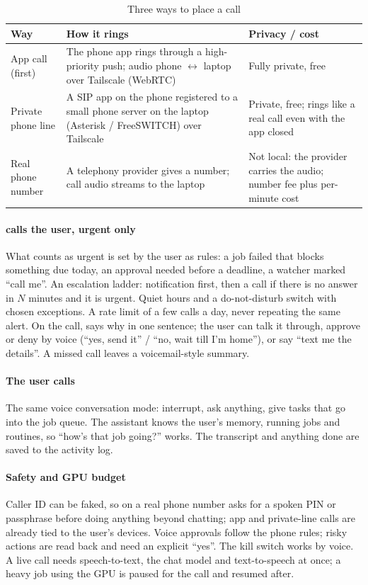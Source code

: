 \begin{table}[t]
\caption{Three ways to place a call}
\label{tab:calls}
\centering\footnotesize
\begin{tabularx}{\columnwidth}{@{}L{17mm}YL{22mm}@{}}
\toprule
Way & How it rings & Privacy / cost \\
\midrule
App call (first) & The phone app rings through a high-priority push; audio phone $\leftrightarrow$ laptop over Tailscale (WebRTC) & Fully private, free \\
Private phone line & A SIP app on the phone registered to a small phone server on the laptop (Asterisk / FreeSWITCH) over Tailscale & Private, free; rings like a real call even with the app closed \\
Real phone number & A telephony provider gives \hivi{} a number; call audio streams to the laptop & Not local: the provider carries the audio; number fee plus per-minute cost \\
\bottomrule
\end{tabularx}
\end{table}

\paragraph{\hivi{} calls the user, urgent only} What counts as urgent is set by the user as rules: a job failed that blocks something due today, an approval needed before a deadline, a watcher marked ``call me''. An escalation ladder: notification first, then a call if there is no answer in $N$ minutes and it is urgent. Quiet hours and a do-not-disturb switch with chosen exceptions. A rate limit of a few calls a day, never repeating the same alert. On the call, \hivi{} says why in one sentence; the user can talk it through, approve or deny by voice (``yes, send it'' / ``no, wait till I'm home''), or say ``text me the details''. A missed call leaves a voicemail-style summary.

\paragraph{The user calls \hivi{}} The same voice conversation mode: interrupt, ask anything, give tasks that go into the job queue. The assistant knows the user's memory, running jobs and routines, so ``how's that job going?'' works. The transcript and anything done are saved to the activity log.

\paragraph{Safety and GPU budget} Caller ID can be faked, so on a real phone number \hivi{} asks for a spoken PIN or passphrase before doing anything beyond chatting; app and private-line calls are already tied to the user's devices. Voice approvals follow the phone rules; risky actions are read back and need an explicit ``yes''. The kill switch works by voice. A live call needs speech-to-text, the chat model and text-to-speech at once; a heavy job using the GPU is paused for the call and resumed after.

